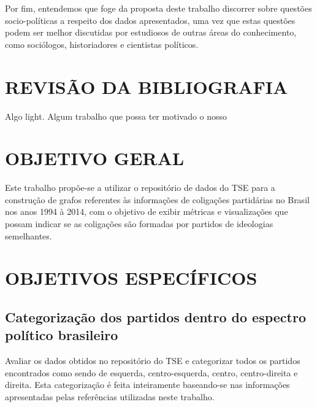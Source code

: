 Por fim, entendemos que foge da proposta deste trabalho discorrer sobre questões socio-políticas a respeito dos dados apresentados, uma vez que estas questões podem ser melhor discutidas por estudiosos de outras áreas do conhecimento, como sociólogos, historiadores e cientistas políticos.

\section{\texorpdfstring{\MakeUppercase{Revisão da Bibliografia}}{}}
\label{proposta__revisao_bibliografia}

Algo light. Algum trabalho que possa ter motivado o nosso



\section{\texorpdfstring{\MakeUppercase{Objetivo Geral}}{}}
\label{proposta__objetivo-geral}

Este trabalho propõe-se a utilizar o repositório de dados do \gls{TSE} para a construção de grafos referentes às informações de coligações partidárias no Brasil nos anos 1994 à 2014, com o objetivo de exibir métricas e visualizações que possam indicar se as coligações são formadas por partidos de ideologias semelhantes.

\section{\texorpdfstring{\MakeUppercase{Objetivos Específicos}}{}}
\label{proposta__objetivos-especificos}

\subsection{Categorização dos partidos dentro do espectro político brasileiro}
\label{proposta__objetivos-especificos--categorizacao}

Avaliar os dados obtidos no repositório do \gls{TSE} e categorizar todos os partidos encontrados como sendo de esquerda, centro-esquerda, centro, centro-direita e direita. Esta categorização é feita inteiramente baseando-se nas informações apresentadas pelas referências utilizadas neste trabalho.


